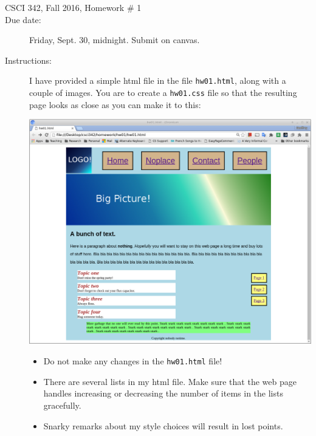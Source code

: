\documentclass{article}
\begin{document}
\begin{description}
  \item[CSCI 342, Fall 2016, Homework \# 1]
  \item[Due date:] Friday, Sept. 30, midnight.  Submit on canvas.
    \item[Instructions:]
I have provided a simple html file in the file {\tt hw01.html},
along with a couple of images.  You are to create a {\tt hw01.css}
file so that the resulting page looks as close as you can make it
to this:

\includegraphics[width=\textwidth]{screenshot.png}

\begin{itemize}
  \item
Do not make any changes in the {\tt hw01.html} file!
\item
There are several lists in my html file.  Make sure that the web page
handles increasing or decreasing the number of items in the lists
gracefully.
\item
  Snarky remarks about my style choices will result in lost points.
\end{itemize}
\end{description}
\end{document}

